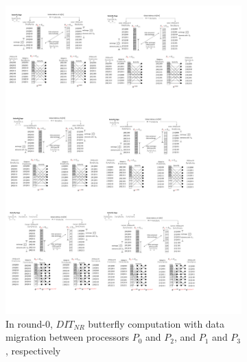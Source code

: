 \documentclass{iacrtrans}
\theoremstyle{plain}
\begin{document}
\begin{figure}[!tb]
\centering
\begin{subfigure}[b]{\textwidth}
\includegraphics[width=\textwidth]{./fig/DataSwapWithPerm1.pdf}
\caption{In round-0, $DIT_{NR}$ butterfly computation with data migration between processors $P_0$ and $P_2$, and $P_1$ and $P_3$, respectively}\label{fig:dataswap_with_perm1}
\end{subfigure}
\hspace{1em}
\begin{subfigure}[b]{\textwidth}\centering

\end{subfigure}
\end{figure}
\end{document}
